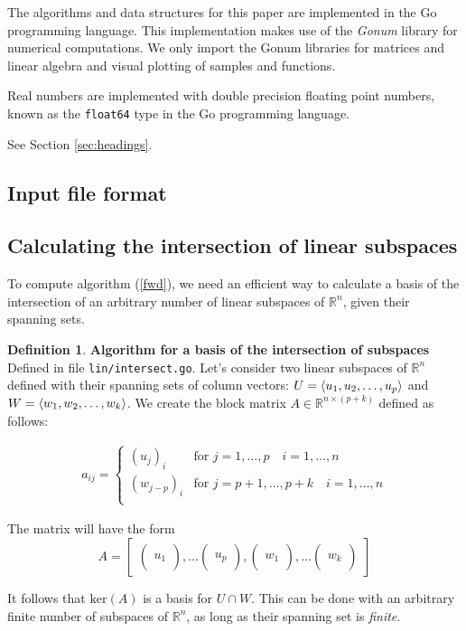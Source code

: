 \documentclass{article}
\theoremstyle{plain}%
\theoremstyle{definition}
\newtheorem{defn}{Definition}[section]
\theoremstyle{remark}
\def\R{\mathbb{R}}
\DeclarePairedDelimiter\spanset{\langle}{\rangle}
\newcommand{\mker}[1]{\text{ker}\left(#1\right)}
\newcommand{\vvvec}[3]{
	\begin{pmatrix}
		#1 \\ #2 \\ #3
	\end{pmatrix}
}
\begin{document}
The algorithms and data structures for this paper are implemented in the Go programming 
language. This implementation makes use of the \textit{Gonum} library for numerical 
computations. We only import the Gonum libraries for matrices and linear algebra 
and visual plotting of samples and functions.

Real numbers are implemented with double precision floating point numbers,  
known as the \texttt{float64} type in the Go programming language.


See Section \ref{sec:headings}.

\subsection{Input file format}

\subsection{Calculating the intersection of linear subspaces}

To compute algorithm (\ref{fwd}), we need an efficient way to calculate a basis 
of the intersection of an arbitrary number of linear subspaces of $\R^n$, given their 
spanning sets. 




\begin{defn}
  \textbf{Algorithm for a basis of the intersection of subspaces} \\
  Defined in file \texttt{lin/intersect.go}.
  Let's consider two linear subspaces of 
  $\R^n$ defined with their spanning sets of column vectors: 
  $U = \spanset{u_1, u_2, \hdots, u_p}$ 
  and $W = \spanset{w_1, w_2, \hdots, w_k}$.
  We create the block matrix $A \in \R^{n \times (p+k)}$ defined as follows:
  
  \begin{equation*}
    \begin{aligned}
      a_{ij} = \begin{cases}
        (u_j)_i & \text{for  } j = 1, \hdots, p \quad i = 1, \hdots, n \\
        (w_{j-p})_i & \text{for  } j = p+1, \hdots, p+k \quad i = 1, \hdots, n \\
      \end{cases}
    \end{aligned}
  \end{equation*}
  
  The matrix will have the form
  \begin{equation*}
    A = \begin{bmatrix}
      \vvvec{}{u_1}{\,}, \hdots \vvvec{}{u_p}{\,}, 
      \vvvec{}{w_1}{\,}, \hdots \vvvec{}{w_k}{\,} 
    \end{bmatrix}
  \end{equation*}

  It follows that $\mker{A}$ is a basis for $U \cap W$. This can be done with an 
  arbitrary finite number of subspaces of $\R^n$, as long as their spanning set is 
  \textit{finite}.
\end{defn}
\end{document}
